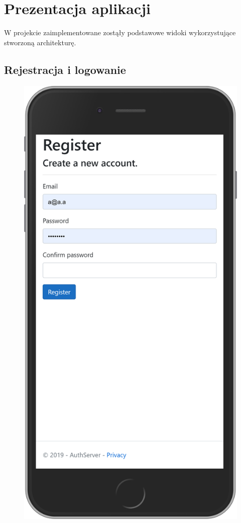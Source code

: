 \chapter{Prezentacja aplikacji}
	W projekcie zaimplementowane zostąły podstawowe widoki wykorzystujące stworzoną architekturę.
\section{Rejestracja i logowanie}
	\begin{figure}[H]
		\centering
		\begin{minipage}{.5\textwidth}
			\includegraphics[width=0.9\linewidth]{rys06/register.png}

\end{minipage}
\end{figure}
